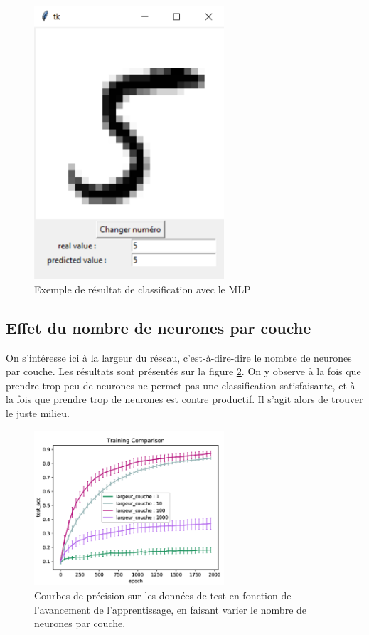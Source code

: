 \begin{figure}[!h]
\centering
\includegraphics[width=200pt]{"images/MLP/MNIST_exemple"}
\caption{Exemple de résultat de classification avec le MLP }
\label{MNIST_exemple}
\end{figure}

\subsection{Effet du nombre de neurones par couche}
On s'intéresse ici à la largeur du réseau, c’est-à-dire-dire le nombre de neurones par couche. Les résultats sont présentés sur la figure \ref{MLP_largeur}. On y observe  à la fois que prendre trop peu de neurones ne permet pas une classification satisfaisante, et à la fois que prendre trop de neurones est contre productif. Il s'agit alors de trouver le juste milieu.

\begin{figure}[!h]
\centering
\includegraphics[width=200pt]{"images/MLP/MLP_largeur"}
\caption{Courbes de précision sur les données de test en fonction de l'avancement de l'apprentissage, en faisant varier le nombre de neurones par couche.\\ }
\label{MLP_largeur}
\end{figure}

